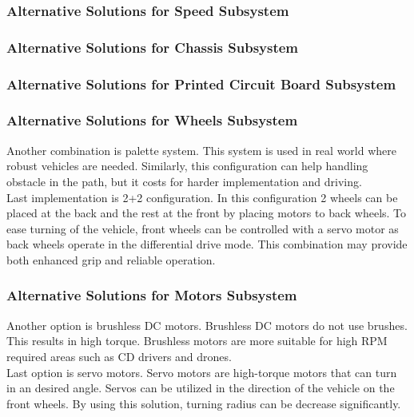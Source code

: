 \documentclass[a4paper,12pt]{article}
\begin{document}
			
		\subsubsection{Alternative Solutions for Speed Subsystem}

		
		\subsubsection{Alternative Solutions for Chassis Subsystem}
			
		\subsubsection{Alternative Solutions for Printed Circuit Board Subsystem}
			
	
		
		\subsubsection{Alternative Solutions for Wheels Subsystem}
		
			Another combination is palette system. This system is used in real world where robust vehicles are needed. Similarly, this configuration can help handling obstacle in the path, but it costs for harder implementation and driving.\\

Last implementation is 2+2 configuration. In this configuration 2 wheels can be placed at the back and the rest at the front by placing motors to back wheels. To ease turning of the vehicle, front wheels can be controlled with a servo motor as back wheels operate in the differential drive mode. This combination may provide both enhanced grip and reliable	 operation. \\
			
		\subsubsection{Alternative Solutions for Motors Subsystem}
			
			Another option is brushless DC motors. Brushless DC motors do not use brushes. This results in high torque. Brushless motors are more suitable for high RPM required areas such as CD drivers and drones.\\

			Last option is servo motors. Servo motors are high-torque motors that can turn in an desired angle. Servos can be utilized in the direction of the vehicle on the front wheels. By using this solution, turning radius can be decrease significantly.\\
\end{document}
